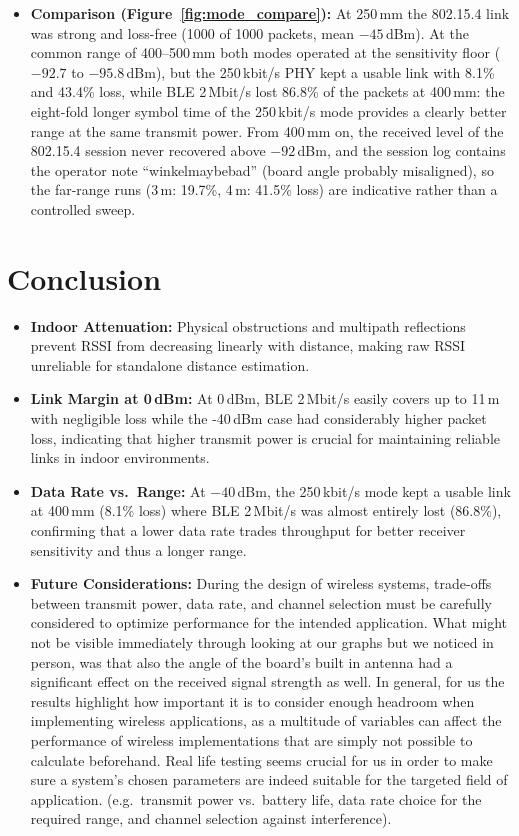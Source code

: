 \begin{itemize}
    \item \textbf{Comparison (Figure~\ref{fig:mode_compare}):}
    At 250\,mm the 802.15.4 link was strong and loss-free (1000 of 1000 packets, mean $-45$\,dBm).
    At the common range of 400--500\,mm both modes operated at the sensitivity floor
    ($-92.7$ to $-95.8$\,dBm), but the 250\,kbit/s PHY kept a usable link with 8.1\% and 43.4\% loss,
    while BLE 2\,Mbit/s lost 86.8\% of the packets at 400\,mm: the eight-fold longer symbol time of the
    250\,kbit/s mode provides a clearly better range at the same transmit power. From 400\,mm on, the
    received level of the 802.15.4 session never recovered above $-92$\,dBm, and the session log contains
    the operator note \enquote{winkelmaybebad} (board angle probably misaligned), so the far-range runs
    (3\,m: 19.7\%, 4\,m: 41.5\% loss) are indicative rather than a controlled sweep.
\end{itemize}

\section{Conclusion}

\begin{itemize}
    \item \textbf{Indoor Attenuation:} Physical obstructions and multipath reflections prevent RSSI from decreasing linearly with distance, making raw RSSI unreliable for standalone distance estimation.
    \item \textbf{Link Margin at 0\,dBm:} At 0\,dBm, BLE 2\,Mbit/s easily covers up to 11\,m with negligible loss while the -40\,dBm case had considerably higher packet loss, indicating that higher transmit power is crucial for maintaining reliable links in indoor environments.
    \item \textbf{Data Rate vs.\ Range:} At $-40$\,dBm, the 250\,kbit/s mode kept a usable link at 400\,mm (8.1\% loss) where BLE 2\,Mbit/s was almost entirely lost (86.8\%), confirming that a lower data rate trades throughput for better receiver sensitivity and thus a longer range.
    \item \textbf{Future Considerations:} During the design of wireless systems, trade-offs between transmit power, data rate, and channel selection must be carefully considered to optimize performance for the intended application. What might not be visible immediately through looking at our graphs but we noticed in person, was that also the angle of the board's built in antenna had a significant effect on the received signal strength as well. In general, for us the results highlight how important it is to consider enough headroom when implementing wireless applications, as a multitude of variables can affect the performance of wireless implementations that are simply not possible to calculate beforehand. Real life testing seems crucial for us in order to make sure a system's chosen parameters are indeed suitable for the targeted field of application.
    (e.g.\ transmit power vs.\ battery life, data rate choice for the required range, and channel selection against interference).
\end{itemize}





\printbibliography[heading=noheader]

